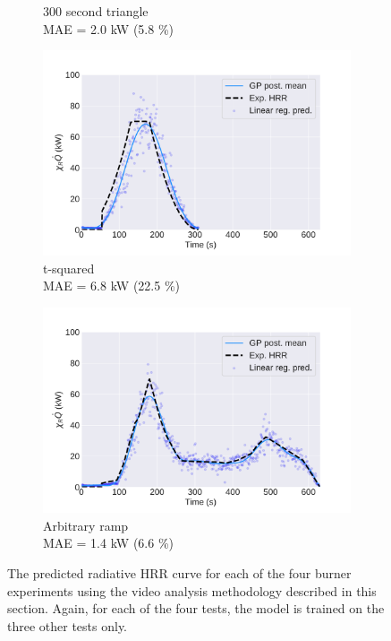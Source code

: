 \documentclass{article}
\begin{document}
\begin{figure}[htbp]
\begin{subfigure}[t]{.45\textwidth}
      \caption{300 second triangle \\ MAE = 2.0 kW (5.8 \%)}
      \label{fig:image_result_300s_triangle}
  \end{subfigure}
   \begin{subfigure}[t]{.45\textwidth}
      \centering
      \includegraphics[width=\textwidth ,keepaspectratio]{figures/image_resultt_squared.pdf}
      \caption{t-squared \\ MAE = 6.8 kW (22.5 \%)}
      \label{fig:image_result_t_squared}
  \end{subfigure}
    \begin{subfigure}[t]{.45\textwidth}
      \centering
      \includegraphics[width=\textwidth ,keepaspectratio]{figures/image_resultweird_curve.pdf}
      \caption{Arbitrary ramp \\ MAE = 1.4 kW (6.6 \%)}
      \label{fig:image_result_weird_curve}
  \end{subfigure}
  \caption{The predicted radiative HRR curve for each of the four burner experiments using the video analysis methodology described in this section. Again, for each of the four tests, the model is trained on the three other tests only.} 
  \label{fig:image_results}
\end{figure}
\end{document}
